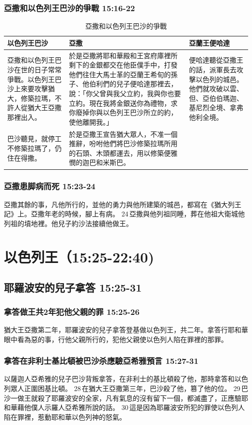 \subsubsection{亞撒和以色列王巴沙的爭戰 15:16-22}
\begin{table}[H]
\centering 
\begin{tabular}{p{3.75cm}|p{8.5cm}|p{4.75cm}}\hline\hline
以色列王巴沙&亞撒&亞蘭王便哈達\\\hline 
亞撒和以色列王巴沙在世的日子常常爭戰。以色列王巴沙上來要攻擊猶大，修築拉瑪，不許人從猶大王亞撒那裡出入。 
&於是亞撒將耶和華殿和王宮府庫裡所剩下的金銀都交在他臣僕手中，打發他們往住大馬士革的亞蘭王希旬的孫子、他伯利們的兒子便哈達那裡去，說：「你父曾與我父立約，我與你也要立約。現在我將金銀送你為禮物，求你廢掉你與以色列王巴沙所立的約，使他離開我。」
&便哈達聽從亞撒王的話，派軍長去攻擊以色列的城邑。他們就攻破以雲、但、亞伯伯瑪迦、基尼烈全境、拿弗他利全境。\\\hline 
巴沙聽見，就停工不修築拉瑪了，仍住在得撒。&於是亞撒王宣告猶大眾人，不准一個推辭，吩咐他們將巴沙修築拉瑪所用的石頭、木頭都運去，用以修築便雅憫的迦巴和米斯巴。&\\\hline 
\end{tabular}
\caption{亞撒和以色列王巴沙的爭戰}
\end{table}


\subsubsection{亞撒患脚病而死 15:23-24}
亞撒其餘的事，凡他所行的，並他的勇力與他所建築的城邑，都寫在《猶大列王記》上。亞撒年老的時候，腳上有病。 24 亞撒與他列祖同睡，葬在他祖大衛城他列祖的墳地裡。他兒子約沙法接續他做王。


\section{以色列王（15:25-22:40)}
\subsection{耶羅波安的兒子拿答 15:25-31} 
\subsubsection{拿答做王共2年犯他父親的罪 15:25-26}
猶大王亞撒第二年，耶羅波安的兒子拿答登基做以色列王，共二年。拿答行耶和華眼中看為惡的事，行他父親所行的，犯他父親使以色列人陷在罪裡的那罪。
 
\subsubsection{拿答在非利士基比頓被巴沙杀應驗亞希雅預言 15:27-31} 
以薩迦人亞希雅的兒子巴沙背叛拿答，在非利士的基比頓殺了他，那時拿答和以色列眾人正圍困基比頓。 28 在猶大王亞撒第三年，巴沙殺了他，篡了他的位。 29 巴沙一做王就殺了耶羅波安的全家，凡有氣息的沒有留下一個，都滅盡了，正應驗耶和華藉他僕人示羅人亞希雅所說的話。 30 這是因為耶羅波安所犯的罪使以色列人陷在罪裡，惹動耶和華以色列神的怒氣。

